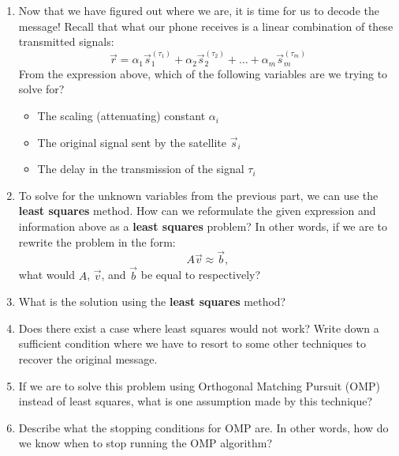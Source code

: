 \begin{enumerate}
    \item Now that we have figured out where we are, it is time for us to decode the message! Recall that what our phone receives is a linear combination of these transmitted signals:
    $$\vec{r} = \alpha_1 \vec{s}_1^{(\tau_1)} + \alpha_2 \vec{s}_2^{(\tau_2)} + \hdots + \alpha_m \vec{s}_m^{(\tau_m)}$$
    From the expression above, which of the following variables are we trying to solve for?
    \begin{itemize}
        \item The scaling (attenuating) constant $\alpha_i$
        \item The original signal sent by the satellite $\vec{s}_i$
        \item The delay in the transmission of the signal $\tau_i$
    \end{itemize}

    \answerbox{3cm}

    \item To solve for the unknown variables from the previous part, we can use the \textbf{least squares} method. How can we reformulate the given expression and information above as a \textbf{least squares} problem? In other words, if we are to rewrite the problem in the form:
    $$A\vec{v} \approx \vec{b},$$
    what would $A$, $\vec{v}$, and $\vec{b}$ be equal to respectively?
    
    \answerbox{4cm}

    \item What is the solution using the \textbf{least squares} method?
    
    \answerbox{3cm}

    \item Does there exist a case where least squares would not work? Write down a sufficient condition where we have to resort to some other techniques to recover the original message.

    \answerbox{3cm}

    \item If we are to solve this problem using Orthogonal Matching Pursuit (OMP) instead of least squares, what is one assumption made by this technique?

    \answerbox{2cm}

    \item Describe what the stopping conditions for OMP are. In other words, how do we know when to stop running the OMP algorithm?

    \answerbox{2cm}

\end{enumerate}